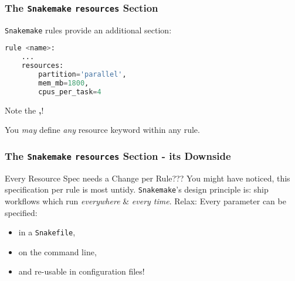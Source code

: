 \begin{frame}[fragile]
	\frametitle{The \texttt{Snakemake} \texttt{resources} Section}
	\texttt{Snakemake} rules provide an additional  section:
	\begin{lstlisting}[language=Python,style=Python]
rule <name>:
	...
	resources:
		partition='parallel',
		mem_mb=1800,
		cpus_per_task=4
	\end{lstlisting}
	\begin{hint}
		Note the \textbf{,}!
	\end{hint}
	\pause
	\begin{docs}
		You \emph{may} define \emph{any} resource keyword within any rule.
	\end{docs}
\end{frame}

\begin{frame}
	\frametitle{The \texttt{Snakemake} \texttt{resources} Section - its Downside}
	\begin{block}{Every Resource Spec needs a Change per Rule???}
		You might have noticed, this specification per rule is most untidy. \texttt{Snakemake}'s design principle is: ship workflows which run \emph{everywhere} \& \emph{every time}.
		\newline \pause
		Relax: Every parameter can be specified:
		\begin{itemize}
			\item in a \texttt{Snakefile},
			\item on the command line,
			\item and re-usable in configuration files!
		\end{itemize}
	\end{block}
\end{frame} 